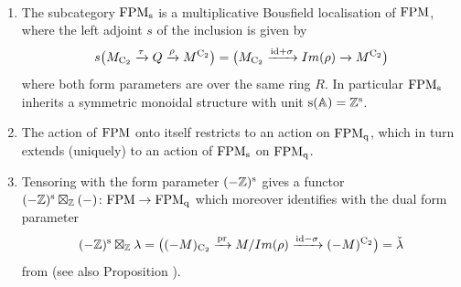 \begin{proposition}%
\label{proposition:symmetric_form_parameters}%
\
\begin{enumerate}
 \item 
The subcategory $\mathrm {FPM}_{\mathrm{s}}$ is a multiplicative Bousfield localisation of $\mathrm {FPM}$, where the left adjoint $s$ of the inclusion is given by
\[
s\big(M_{\mathrm{C_2}}\xrightarrow{\tau}Q\xrightarrow{\rho}M^{\mathrm{C_2}}\big)=\big(M_{\mathrm{C_2}}\xrightarrow{\mathrm{id}+\sigma}Im(\rho)\xrightarrow{}M^{\mathrm{C_2}}\big)
\]
where both form parameters are over the same ring $R$.
In particular $\mathrm {FPM}_{\mathrm{s}}$ inherits a symmetric monoidal structure with unit $\mathrm{s}(\mathbb{A})= \mathbb{Z}^{\mathrm{s}}$. 
\item The action of $\mathrm {FPM}$ onto itself restricts to an action on $\mathrm {FPM}_{\mathrm{q}}$, which in turn extends (uniquely) to an action of $\mathrm {FPM}_{\mathrm{s}}$ on $\mathrm {FPM}_{\mathrm{q}}$.
\item Tensoring with the form parameter $(-\mathbb{Z})^{\mathrm{s}}$ gives a functor $(-\mathbb{Z})^{\mathrm{s}}\boxtimes_{\mathbb{Z}}(-)\colon \mathrm {FPM}\to\mathrm {FPM}_{\mathrm{q}}$ which moreover identifies with the dual form parameter
\[
 (-\mathbb{Z})^{\mathrm{s}}\boxtimes_{\mathbb{Z}}\lambda=\big((-M)_{\mathrm{C_2}}\xrightarrow{\mathrm{pr}}M/Im(\rho)\xrightarrow{\mathrm{id}-\sigma}(-M)^{\mathrm{C_2}}\big)=\check{\lambda}
\]
from \cite{SchlichtinghigherI} (see also Proposition ).
\end{enumerate}
\end{proposition}

